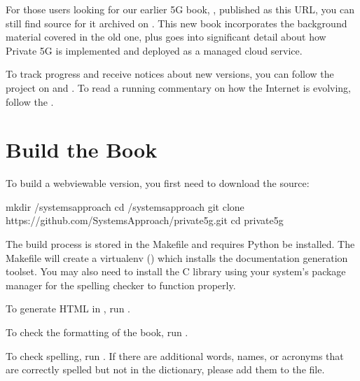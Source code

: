 \documentclass[a4paper,11pt,english]{sphinxmanual}
\begin{document}
\sphinxAtStartPar
For those users looking for our earlier 5G book, , published as this URL, you can still find source
for it archived on .
This new book incorporates the background material covered in the old
one, plus goes into significant detail about how Private 5G is
implemented and deployed as a managed cloud service.

\sphinxAtStartPar
To track progress and receive notices about new versions, you can follow
the project on
and . To read a running
commentary on how the Internet is evolving, follow the .


\section{Build the Book}
\label{\detokenize{README:build-the-book}}
\sphinxAtStartPar
To build a web\sphinxhyphen{}viewable version, you first need to download the source:

\begin{sphinxVerbatim}[commandchars=\\\{\}]
\PYGZdl{} mkdir \PYGZti{}/systemsapproach
\PYGZdl{} cd \PYGZti{}/systemsapproach
\PYGZdl{} git clone https://github.com/SystemsApproach/private5g.git 
\PYGZdl{} cd private5g
\end{sphinxVerbatim}

\sphinxAtStartPar
The build process is stored in the Makefile and requires Python be
installed. The Makefile will create a virtualenv () which
installs the documentation generation toolset.  You may also need to
install the  C library using your system’s package manager
for the spelling checker to function properly.

\sphinxAtStartPar
To generate HTML in ,  run .

\sphinxAtStartPar
To check the formatting of the book, run .

\sphinxAtStartPar
To check spelling, run . If there are additional
words, names, or acronyms that are correctly spelled but not in the dictionary,
please add them to the  file.
\end{document}
